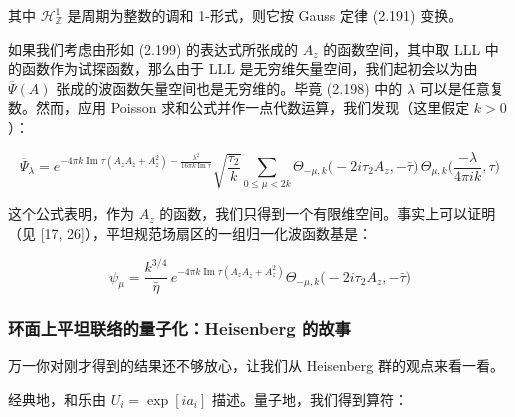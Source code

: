 其中 $\mathcal{H}^1_{\mathbb{Z}}$ 是周期为整数的调和 1-形式，则它按 Gauss 定律 (2.191) 变换。

如果我们考虑由形如 (2.199) 的表达式所张成的 $A_z$ 的函数空间，其中取 LLL 中的函数作为试探函数，那么由于 LLL 是无穷维矢量空间，我们起初会以为由 $\overline{\Psi}(A)$ 张成的波函数矢量空间也是无穷维的。毕竟 (2.198) 中的 $\lambda$ 可以是任意复数。然而，应用 Poisson 求和公式并作一点代数运算，我们发现（这里假定 $k>0$）：

\begin{equation}
  \overline{\Psi}_\lambda
  =e^{-4\pi k\operatorname{Im}\tau\left(A_zA_{\bar z}+A_z^2\right)-\frac{\lambda^2}{16\pi k\operatorname{Im}\tau}}
  \sqrt{\frac{\tau_2}{k}}\sum_{0\le\mu<2k}
  \Theta_{-\mu,k}\big(-2i\tau_2A_z,-\bar\tau\big)\,
  \Theta_{\mu,k}\Big(\frac{-\lambda}{4\pi ik},\tau\Big)
  \tag{2.200}
  \label{eq:2.200}
\end{equation}

这个公式表明，作为 $A_z$ 的函数，我们只得到一个有限维空间。事实上可以证明（见 [17, 26]），平坦规范场扇区的一组归一化波函数基是：

\begin{equation}
  \psi_\mu=\frac{k^{3/4}}{\bar\eta}\,
  e^{-4\pi k\operatorname{Im}\tau\left(A_zA_{\bar z}+A_z^2\right)}
  \Theta_{-\mu,k}\big(-2i\tau_2A_z,-\bar\tau\big)
  \tag{2.201}
  \label{eq:2.201}
\end{equation}

\subsubsection{环面上平坦联络的量子化：Heisenberg 的故事} %

万一你对刚才得到的结果还不够放心，让我们从 Heisenberg 群的观点来看一看。

经典地，和乐由 $U_i=\exp[ia_i]$ 描述。量子地，我们得到算符：

